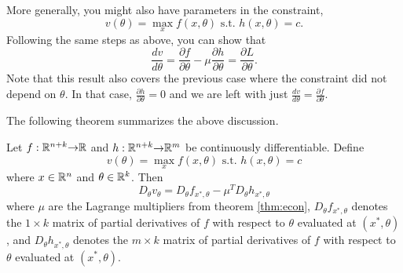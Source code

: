 More generally, you might also have parameters in the constraint, 
\[ v(\theta) = \max_x f(x,\theta) \text{ s.t. } h(x,\theta) = c. \]
Following the same steps as above, you can show that
\[ \frac{dv}{d\theta} = \frac{\partial f}{\partial
  \theta} -  \mu \frac{\partial h}{\partial
  \theta} = \frac{\partial L}{\partial \theta}. \]
Note that this result also covers the previous case where the
constraint did not depend on $\theta$. In that case, $\frac{\partial
  h}{\partial \theta} = 0$ and we are left with just
$\frac{dv}{d\theta} = \frac{\partial f}{\partial \theta}$.
  
The following theorem summarizes the above discussion.
\begin{theorem}[Envelope]
  Let $f:\mathbb{R}^{n+k} {\rightarrow} \mathbb{R}$ and $h: \mathbb{R}^{n+k} {\rightarrow}
  \mathbb{R}^m$ be continuously differentiable. Define
  \[ v(\theta) = \max_x f(x,\theta) \text{ s.t. } h(x,\theta) = c \]
  where $x \in \mathbb{R}^n$ and $\theta \in \mathbb{R}^k$. Then
  \[ D_\theta v_\theta = D_\theta f_{x^*,\theta} - \mu^T D_\theta
  h_{x^*,\theta} \] 
  where $\mu$ are the Lagrange multipliers from theorem
  \ref{thm:econ}, $D_\theta f_{x^*,\theta}$ denotes the $1 \times
  k$ matrix of partial derivatives of $f$ with respect to $\theta$
  evaluated at $(x^*,\theta)$ , and $D_\theta h_{x^*,\theta}$ denotes
  the $m \times k$ matrix of partial derivatives of $f$ with respect
  to $\theta$ evaluated at $(x^*,\theta)$. 
\end{theorem}

